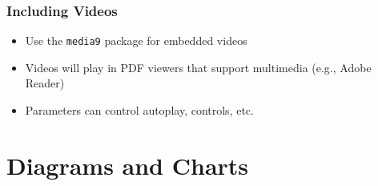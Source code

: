 \documentclass[aspectratio=169,professionalfonts]{beamer}
\begin{document}

\begin{frame}
    \frametitle{Including Videos}

    \begin{tcolorbox}[colback=ugmLightGrey,colframe=ugmBlue,title=Video Tip]
        \begin{itemize}
            \item Use the \texttt{media9} package for embedded videos
            \item Videos will play in PDF viewers that support multimedia (e.g., Adobe Reader)
            \item Parameters can control autoplay, controls, etc.
        \end{itemize}
    \end{tcolorbox}
\end{frame}
    

\section{Diagrams and Charts}
\end{document}
